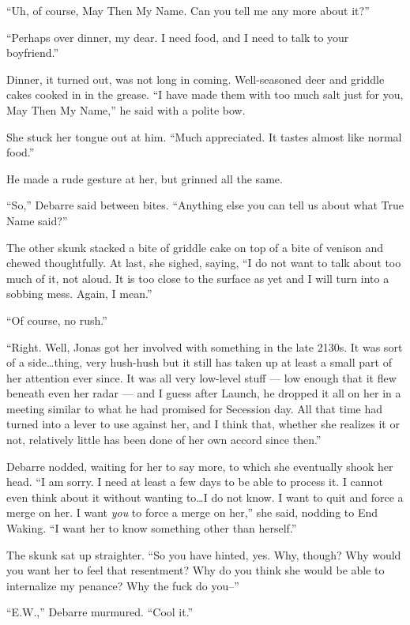 ``Uh, of course, May Then My Name. Can you tell me any more about it?''

``Perhaps over dinner, my dear. I need food, and I need to talk to your boyfriend.''

Dinner, it turned out, was not long in coming. Well-seasoned deer and griddle cakes cooked in in the grease. ``I have made them with too much salt just for you, May Then My Name,'' he said with a polite bow.

She stuck her tongue out at him. ``Much appreciated. It tastes almost like normal food.''

He made a rude gesture at her, but grinned all the same.

``So,'' Debarre said between bites. ``Anything else you can tell us about what True Name said?''

The other skunk stacked a bite of griddle cake on top of a bite of venison and chewed thoughtfully. At last, she sighed, saying, ``I do not want to talk about too much of it, not aloud. It is too close to the surface as yet and I will turn into a sobbing mess. Again, I mean.''

``Of course, no rush.''

``Right. Well, Jonas got her involved with something in the late 2130s. It was sort of a side\ldots thing, very hush-hush but it still has taken up at least a small part of her attention ever since. It was all very low-level stuff — low enough that it flew beneath even her radar — and I guess after Launch, he dropped it all on her in a meeting similar to what he had promised for Secession day. All that time had turned into a lever to use against her, and I think that, whether she realizes it or not, relatively little has been done of her own accord since then.''

Debarre nodded, waiting for her to say more, to which she eventually shook her head. ``I am sorry. I need at least a few days to be able to process it. I cannot even think about it without wanting to\ldots I do not know. I want to quit and force a merge on her. I want \emph{you} to force a merge on her,'' she said, nodding to End Waking. ``I want her to know something other than herself.''

The skunk sat up straighter. ``So you have hinted, yes. Why, though? Why would you want her to feel that resentment? Why do you think she would be able to internalize my penance? Why the fuck do you--''

``E.W.,'' Debarre murmured. ``Cool it.''


